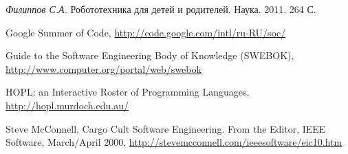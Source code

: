 \documentclass[a4paper]{article}
\begin{document}
\begin{thebibliography}{9001}
   \emph{Филиппов С.А.} Робототехника для детей и родителей. Наука. 2011. 264 С.

   Google Summer of Code, \url{http://code.google.com/intl/ru-RU/soc/}

   Guide to the Software Engineering Body of Knowledge (SWEBOK), \url{http://www.computer.org/portal/web/swebok}
  
   HOPL: an Interactive Roster of Programming Languages,  \url{http://hopl.murdoch.edu.au/}
  
   Steve McConnell, Cargo Cult Software Engineering. From the Editor, IEEE Software, March/April 2000, \url{http://stevemcconnell.com/ieeesoftware/eic10.htm}


\end{thebibliography}
\end{document}
